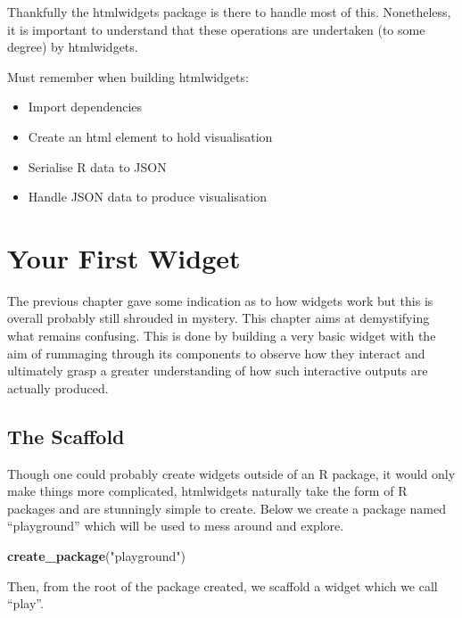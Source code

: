 \documentclass[
]{krantz}
\makeatletter
\newenvironment{Shaded}{\begin{snugshade}}{\end{snugshade}}
\newcommand{\KeywordTok}[1]{\textcolor[rgb]{0.27,0.27,0.27}{\textbf{#1}}}
\newcommand{\NormalTok}[1]{#1}
\newcommand{\StringTok}[1]{\textcolor[rgb]{0.5,0.5,0.5}{#1}}
\providecommand{\tightlist}{%
  \setlength{\itemsep}{0pt}\setlength{\parskip}{0pt}}
\newenvironment{kframe}{%
\medskip{}
\setlength{\fboxsep}{.8em}
 \def\at@end@of@kframe{}%
 \ifinner\ifhmode%
  \def\at@end@of@kframe{\end{minipage}}%
  \begin{minipage}{\columnwidth}%
 \fi\fi%
 \def\FrameCommand##1{\hskip\@totalleftmargin \hskip-\fboxsep
 \colorbox{shadecolor}{##1}\hskip-\fboxsep
     \hskip-\linewidth \hskip-\@totalleftmargin \hskip\columnwidth}%
 \MakeFramed {\advance\hsize-\width
   \@totalleftmargin\z@ \linewidth\hsize
   \@setminipage}}%
 {\par\unskip\endMakeFramed%
 \at@end@of@kframe}
\renewenvironment{Shaded}{\begin{kframe}}{\end{kframe}}
\makeatother
\begin{document}
Thankfully the htmlwidgets package is there to handle most of this. Nonetheless, it is important to understand that these operations are undertaken (to some degree) by htmlwidgets.

Must remember when building htmlwidgets:

\begin{itemize}
\tightlist
\item
  Import dependencies
\item
  Create an html element to hold visualisation
\item
  Serialise R data to JSON
\item
  Handle JSON data to produce visualisation
\end{itemize}

\hypertarget{your-first-widget}{%
\chapter{Your First Widget}\label{your-first-widget}}

The previous chapter gave some indication as to how widgets work but this is overall probably still shrouded in mystery. This chapter aims at demystifying what remains confusing. This is done by building a very basic widget with the aim of rummaging through its components to observe how they interact and ultimately grasp a greater understanding of how such interactive outputs are actually produced.

\hypertarget{the-scaffold}{%
\section*{The Scaffold}\label{the-scaffold}}


Though one could probably create widgets outside of an R package, it would only make things more complicated, htmlwidgets naturally take the form of R packages and are stunningly simple to create. Below we create a package named ``playground'' which will be used to mess around and explore.

\begin{Shaded}
\begin{Highlighting}[]
\KeywordTok{create\_package}\NormalTok{(}\StringTok{"playground"}\NormalTok{)}
\end{Highlighting}
\end{Shaded}

Then, from the root of the package created, we scaffold a widget which we call ``play''.
\end{document}
